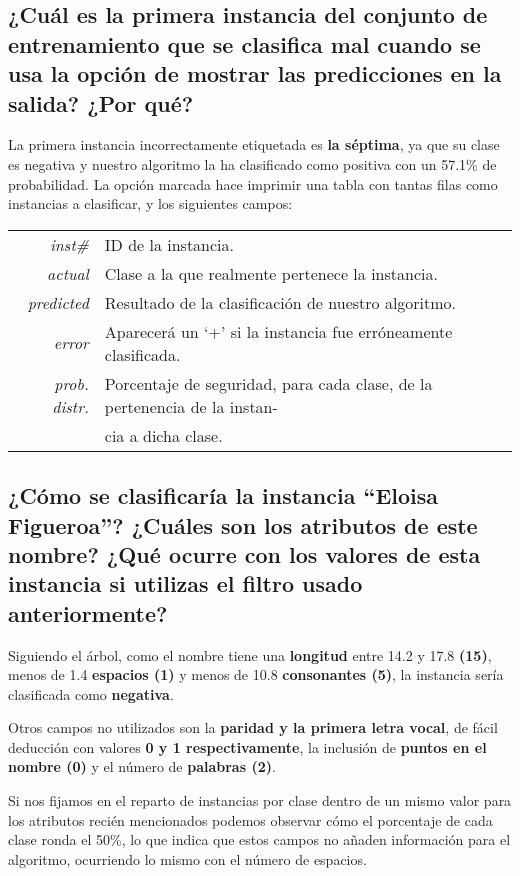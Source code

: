 \documentclass[12pt]{article}
\begin{document}
\subsection*{\small ¿Cuál es la primera instancia del conjunto de entrenamiento que se clasifica mal cuando se usa la opción de mostrar las predicciones en la salida? ¿Por qué?}

La primera instancia incorrectamente etiquetada es \textbf{la séptima}, ya que su clase es negativa y nuestro algoritmo la ha clasificado como positiva con un 57.1\% de probabilidad. La opción marcada hace imprimir una tabla con tantas filas como instancias a clasificar, y los siguientes campos:

\begin{tabular}{rl}
    \emph{inst\#} & ID de la instancia.\\
    \emph{actual} & Clase a la que realmente pertenece la instancia.\\
    \emph{predicted} & Resultado de la clasificación de nuestro algoritmo.\\
    \emph{error} & Aparecerá un `+' si la instancia fue erróneamente clasificada.\\
    \emph{prob. distr.} & Porcentaje de seguridad, para cada clase, de la pertenencia de la instan- \\ &cia a dicha clase.
\end{tabular}

\subsection*{\small ¿Cómo se clasificaría la instancia ``Eloisa Figueroa''? ¿Cuáles son los atributos de este nombre? ¿Qué ocurre con los valores de esta instancia si utilizas el filtro usado anteriormente?}

Siguiendo el árbol, como el nombre tiene una \textbf{longitud} entre 14.2 y 17.8 \textbf{(15)}, menos de 1.4 \textbf{espacios (1)} y menos de 10.8 \textbf{consonantes (5)}, la instancia sería clasificada como \textbf{negativa}.

Otros campos no utilizados son la \textbf{paridad y la primera letra vocal}, de fácil deducción con valores \textbf{0 y 1 respectivamente}, la inclusión de \textbf{puntos en el nombre (0)} y el número de \textbf{palabras (2)}.

Si nos fijamos en el reparto de instancias por clase dentro de un mismo valor para los atributos recién mencionados podemos observar cómo el porcentaje de cada clase ronda el 50\%, lo que indica que estos campos no añaden información para el algoritmo, ocurriendo lo mismo con el número de espacios.
\end{document}
